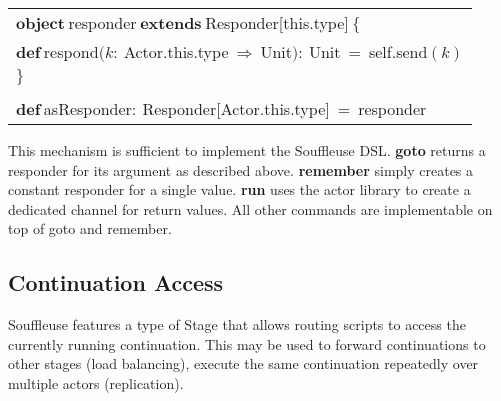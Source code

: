 \documentclass[preprint]{sigplanconf}
\begin{document}
\medskip
{\footnotesize\begin{tabular}{l}                                
$\mathbf{object}\ $responder$\ \mathbf{extends}\ $Responder[this.type]$\ \{$\\
\hspace{2ex}$\mathbf{def}\ $respond$(\mathit{k}:\ $Actor.this.type$\ \Rightarrow\ $Unit$):\ $Unit$\ =\ $self.send$(\mathit{k})$\\
$\}$\\
\\
$\mathbf{def}\ $asResponder$:\ $Responder[Actor.this.type]$\ =\ $responder\\
\end{tabular}}
\medskip

This mechanism is sufficient to implement the Souffleuse DSL. \textbf{goto} returns a responder for
its argument as described above. \textbf{remember} simply creates a constant responder for a single
value. \textbf{run} uses the actor library to create a dedicated channel for return values. All
other commands are implementable on top of goto and remember.


\subsection{Continuation Access}

Souffleuse features a type of Stage that allows routing scripts to access the currently running
continuation. This may be used to forward continuations to other stages (load balancing), execute
the same continuation repeatedly over multiple actors (replication).
\end{document}
